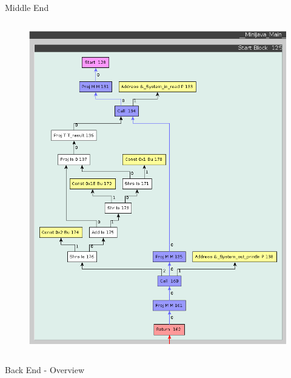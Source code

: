 \documentclass[en,16:9]{sdqbeamer}
\begin{document}
\begin{frame}{Middle End}
\begin{columns}
		\begin{column}{0.3\linewidth}
			\begin{figure}
				\centering
				\includegraphics[scale=0.2]{images/optimization-after.png}
			\end{figure}
		\end{column}
	\end{columns}
\end{frame}

\begin{frame}{Back End - Overview}
	\begin{figure}
		\centering
		
	\end{figure}
\end{frame}
\end{document}
